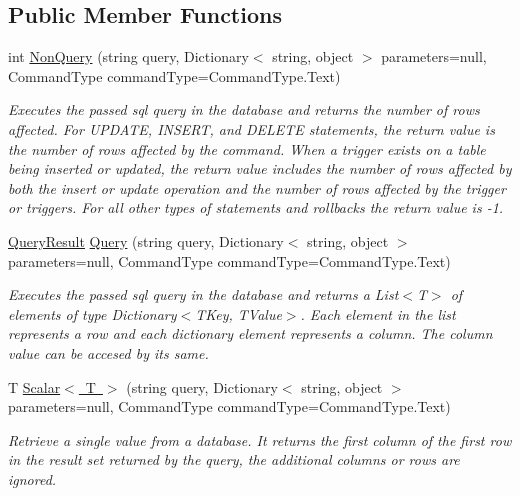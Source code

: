 \subsection*{Public Member Functions}
\begin{DoxyCompactItemize}
\item 
int \mbox{\hyperlink{interfaceDataBaseAccess_1_1IDataAccessService_a2fb8cf4238c955d7884bdb405bef50e1}{Non\+Query}} (string query, Dictionary$<$ string, object $>$ parameters=null, Command\+Type command\+Type=Command\+Type.\+Text)
\begin{DoxyCompactList}\small\item\em Executes the passed sql query in the database and returns the number of rows affected. For U\+P\+D\+A\+TE, I\+N\+S\+E\+RT, and D\+E\+L\+E\+TE statements, the return value is the number of rows affected by the command. When a trigger exists on a table being inserted or updated, the return value includes the number of rows affected by both the insert or update operation and the number of rows affected by the trigger or triggers. For all other types of statements and rollbacks the return value is -\/1. \end{DoxyCompactList}\item 
\mbox{\hyperlink{classDataBaseAccess_1_1QueryResult}{Query\+Result}} \mbox{\hyperlink{interfaceDataBaseAccess_1_1IDataAccessService_a9beba3c892e23d5c9278d5702a6b64e8}{Query}} (string query, Dictionary$<$ string, object $>$ parameters=null, Command\+Type command\+Type=Command\+Type.\+Text)
\begin{DoxyCompactList}\small\item\em Executes the passed sql query in the database and returns a List$<$\+T$>$ of elements of type Dictionary$<$\+T\+Key, T\+Value$>$. Each element in the list represents a row and each dictionary element represents a column. The column value can be accesed by its same. \end{DoxyCompactList}\item 
T \mbox{\hyperlink{interfaceDataBaseAccess_1_1IDataAccessService_a0788e764e3f4418039d73291b8c7e87c}{Scalar$<$ T $>$}} (string query, Dictionary$<$ string, object $>$ parameters=null, Command\+Type command\+Type=Command\+Type.\+Text)
\begin{DoxyCompactList}\small\item\em Retrieve a single value from a database. It returns the first column of the first row in the result set returned by the query, the additional columns or rows are ignored. \end{DoxyCompactList}\end{DoxyCompactItemize}
